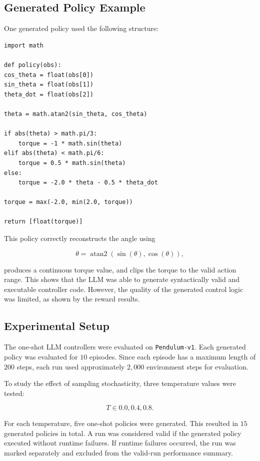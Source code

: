 \documentclass[11pt,a4paper]{article}
\begin{document}
\subsection{Generated Policy Example}

One generated policy used the following structure:

\begin{verbatim}
import math

def policy(obs):
cos_theta = float(obs[0])
sin_theta = float(obs[1])
theta_dot = float(obs[2])

theta = math.atan2(sin_theta, cos_theta)

if abs(theta) > math.pi/3:
    torque = -1 * math.sin(theta)
elif abs(theta) < math.pi/6:
    torque = 0.5 * math.sin(theta)
else:
    torque = -2.0 * theta - 0.5 * theta_dot

torque = max(-2.0, min(2.0, torque))

return [float(torque)]
\end{verbatim}

This policy correctly reconstructs the angle using

\[
\theta = \operatorname{atan2}(\sin(\theta), \cos(\theta)),
\]

produces a continuous torque value, and clips the torque to the valid action range. This shows that the LLM was able to generate syntactically valid and executable controller code. However, the quality of the generated control logic was limited, as shown by the reward results.

\subsection{Experimental Setup}

The one-shot LLM controllers were evaluated on \texttt{Pendulum-v1}. Each generated policy was evaluated for $10$ episodes. Since each episode has a maximum length of $200$ steps, each run used approximately $2{,}000$ environment steps for evaluation.

To study the effect of sampling stochasticity, three temperature values were tested:

\[
T \in {0.0, 0.4, 0.8}.
\]

For each temperature, five one-shot policies were generated. This resulted in $15$ generated policies in total. A run was considered valid if the generated policy executed without runtime failures. If runtime failures occurred, the run was marked separately and excluded from the valid-run performance summary.
\end{document}
